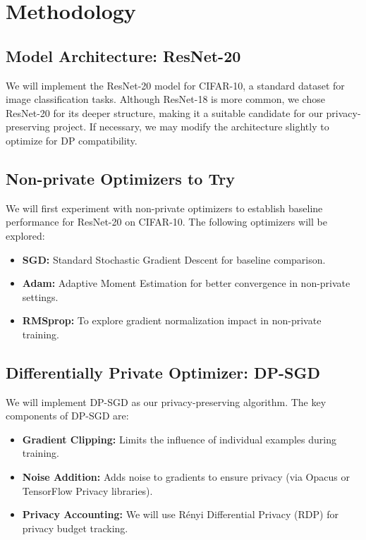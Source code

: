 \documentclass{article}
\begin{document}
    \section{Methodology}\label{sec:methodology}

    \subsection{Model Architecture: ResNet-20}\label{subsec:model-architecture:-resnet-20}
    We will implement the ResNet-20 model for CIFAR-10, a standard dataset for image classification tasks.
    Although ResNet-18 is more common, we chose ResNet-20 for its deeper structure, making it a suitable candidate
    for our privacy-preserving project.
    If necessary, we may modify the architecture slightly to optimize for DP compatibility.

    \subsection{Non-private Optimizers to Try}\label{subsec:non-private-optimizers-to-try}
    We will first experiment with non-private optimizers to establish baseline performance for ResNet-20 on CIFAR-10.
    The following optimizers will be explored:
    \begin{itemize}
        \item \textbf{SGD:} Standard Stochastic Gradient Descent for baseline comparison.
        \item \textbf{Adam:} Adaptive Moment Estimation for better convergence in non-private settings.
        \item \textbf{RMSprop:} To explore gradient normalization impact in non-private training.
    \end{itemize}

    \subsection{Differentially Private Optimizer: DP-SGD}\label{subsec:differentially-private-optimizer:-dp-sgd}
    We will implement DP-SGD as our privacy-preserving algorithm.
    The key components of DP-SGD are:
    \begin{itemize}
        \item \textbf{Gradient Clipping:} Limits the influence of individual examples during training.
        \item \textbf{Noise Addition:} Adds noise to gradients to ensure privacy (via Opacus or TensorFlow Privacy libraries).
        \item \textbf{Privacy Accounting:} We will use Rényi Differential Privacy (RDP) for privacy budget tracking.
    \end{itemize}
\end{document}
